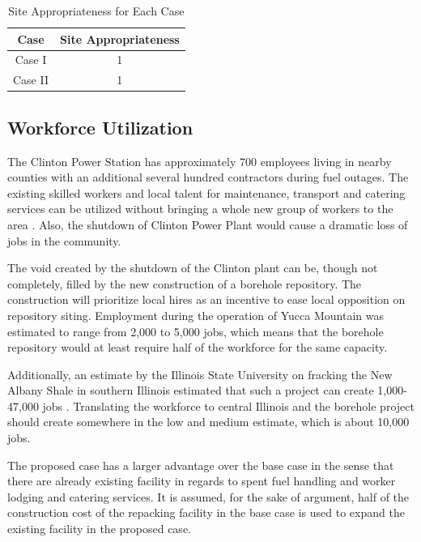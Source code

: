   
\begin{table}[h]
	\centering
        \caption {Site Appropriateness for Each Case}
		\begin{tabular}{|c|c|}
			\hline
			Case & Site Appropriateness \\
			\hline
			Case I & 1 \\
			Case II & 1 \\
			\hline
                \end{tabular}
\end{table}

\subsection{Workforce Utilization}

The Clinton
 Power Station has approximately 700 employees living in nearby counties with an
additional several hundred contractors during fuel 
outages\cite{exelon_clinton_2016}.
The existing skilled workers and local talent for maintenance, transport and catering
services can be utilized without bringing a whole new group of workers to the 
area \cite{iaea_managing_2008}. Also, the shutdown of Clinton Power Plant would cause a dramatic
loss of jobs in the community. 

The void created by the shutdown of the Clinton plant can be, though not
completely, filled by the new construction of a borehole repository. The construction
will prioritize local hires as an incentive to ease local opposition on repository
 siting. Employment during the operation of Yucca Mountain was estimated to range from
 2,000 to 5,000 jobs, \cite{riddel_economic_2003} which means that the borehole repository
 would at least require half of the workforce for the same capacity. 

Additionally, an estimate by the Illinois State University on fracking the New Albany
Shale in southern Illinois estimated that such a project can create 1,000-47,000 jobs
\cite{loomis_potential_2012}. Translating the workforce to central Illinois and the borehole
project should create somewhere in the low and medium estimate, which is about 10,000
jobs. 

The proposed case has a larger advantage over the base case in the sense that there
are already existing facility in regards to spent fuel handling and worker lodging 
and catering services. 
It is assumed, for the sake of argument, half of the construction cost of the
repacking facility in the base case is used to expand the existing facility in the
proposed case. 


